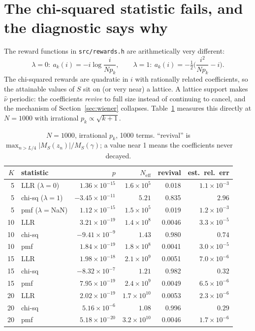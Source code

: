 \documentclass[11pt]{article}
\newcommand{\Neff}{N_{\mathrm{eff}}}
\begin{document}
\section{The chi-squared statistic fails, and the diagnostic says why}
\label{sec:lattice}

The reward functions in \texttt{src/rewards.h} are arithmetically very different:
\[
  \lambda=0:\ a_k(i)=-i\log\!\frac{i}{Np_k},
  \qquad
  \lambda=1:\ a_k(i)=-\tfrac12\Big(\frac{i^2}{Np_k}-i\Big).
\]
The chi-squared rewards are quadratic in $i$ with rationally related coefficients, so the attainable
values of $S$ sit on (or very near) a lattice. A lattice support makes $\hat\nu$ periodic: the
coefficients \emph{revive} to full size instead of continuing to cancel, and the mechanism of
Section~\ref{sec:wiener} collapses. Table~\ref{tab:lambda} measures this directly at $N=1000$ with
irrational $p_k\propto\sqrt{k+1}$.

\begin{table}[h]
\centering
\caption{$N=1000$, irrational $p_k$, 1000 terms. ``revival'' is
$\max_{n>L/4}|M_S(z_n)|/M_S(\gamma)$; a value near 1 means the coefficients never decayed.}
\label{tab:lambda}
\begin{tabular}{@{}rlrrrr@{}}
\toprule
$K$ & statistic & $p$ & $\Neff$ & revival & est.\ rel.\ err \\
\midrule
5  & LLR ($\lambda{=}0$)      & $1.36\times10^{-15}$ & $1.6\times10^{5}$  & 0.018 & $1.1\times10^{-3}$ \\
5  & chi-sq ($\lambda{=}1$)   & $-3.45\times10^{-11}$ & $5.21$            & 0.835 & $2.96$ \\
5  & pmf ($\lambda{=}$NaN)    & $1.12\times10^{-15}$ & $1.5\times10^{5}$  & 0.019 & $1.2\times10^{-3}$ \\
\midrule
10 & LLR                      & $3.21\times10^{-19}$ & $1.4\times10^{8}$  & 0.0046 & $3.3\times10^{-5}$ \\
10 & chi-sq                   & $-9.41\times10^{-9}$ & $1.43$             & 0.980 & $0.74$ \\
10 & pmf                      & $1.84\times10^{-19}$ & $1.8\times10^{8}$  & 0.0041 & $3.0\times10^{-5}$ \\
\midrule
15 & LLR                      & $1.98\times10^{-18}$ & $2.1\times10^{9}$  & 0.0051 & $7.0\times10^{-6}$ \\
15 & chi-sq                   & $-8.32\times10^{-7}$ & $1.21$             & 0.982 & $0.32$ \\
15 & pmf                      & $7.95\times10^{-19}$ & $2.4\times10^{9}$  & 0.0049 & $6.5\times10^{-6}$ \\
\midrule
20 & LLR                      & $2.02\times10^{-19}$ & $1.7\times10^{10}$ & 0.0053 & $2.3\times10^{-6}$ \\
20 & chi-sq                   & $5.16\times10^{-6}$  & $1.08$             & 0.996 & $0.29$ \\
20 & pmf                      & $5.18\times10^{-20}$ & $3.2\times10^{10}$ & 0.0046 & $1.7\times10^{-6}$ \\
\bottomrule
\end{tabular}
\end{table}
\end{document}
